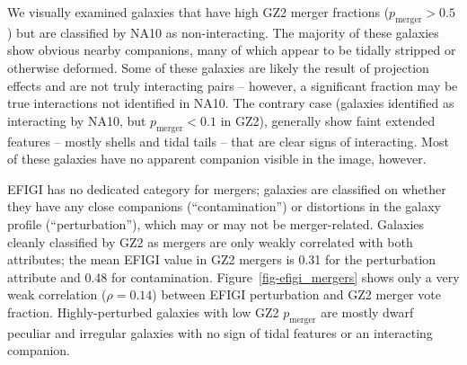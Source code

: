 \documentclass[useAMS,usenatbib]{mn2e}
\begin{document}
We visually examined galaxies that have high GZ2 merger fractions ($p_\mathrm{merger}>0.5$) but are classified by NA10 as non-interacting. The majority of these galaxies show obvious nearby companions, many of which appear to be tidally stripped or otherwise deformed. Some of these galaxies are likely the result of projection effects and are not truly interacting pairs -- however, a significant fraction may be true interactions not identified in NA10. The contrary case (galaxies identified as interacting by NA10, but $p_\mathrm{merger}<0.1$ in GZ2), generally show faint extended features -- mostly shells and tidal tails -- that are clear signs of interacting. Most of these galaxies have no apparent companion visible in the image, however.

%
%

EFIGI has no dedicated category for mergers; galaxies are classified on whether they have any close companions (``contamination'') or distortions in the galaxy profile (``perturbation''), which may or may not be merger-related. Galaxies cleanly classified by GZ2 as mergers are only weakly correlated with both attributes; the mean EFIGI value in GZ2 mergers is 0.31 for the perturbation attribute and 0.48 for contamination. Figure~\ref{fig-efigi_mergers} shows only a very weak correlation ($\rho=0.14$) between EFIGI perturbation and GZ2 merger vote fraction. Highly-perturbed galaxies with low GZ2 $p_\mathrm{merger}$ are mostly dwarf peculiar and irregular galaxies with no sign of tidal features or an interacting companion. 
\end{document}
